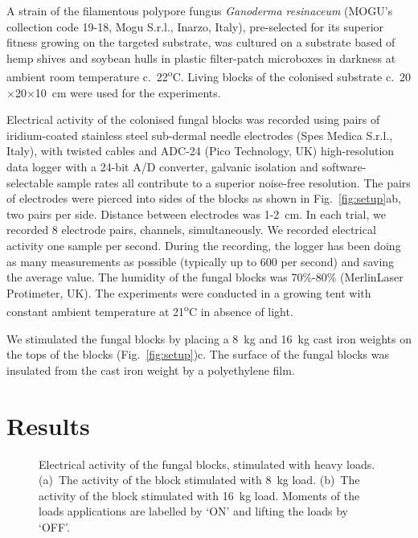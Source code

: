 \documentclass[]{elsarticle}
\begin{document}
A strain of the filamentous polypore fungus \emph{Ganoderma resinaceum} (MOGU's collection code 19-18, Mogu S.r.l., Inarzo, Italy), pre-selected for its superior fitness growing on the targeted substrate, was cultured on a substrate based of hemp shives and soybean hulls in plastic filter-patch microboxes in darkness at ambient room temperature c.~22\textsuperscript{o}C. Living blocks of the colonised substrate c.~20$\times$20$\times$10~cm were used for the experiments.

Electrical activity of the colonised fungal blocks was recorded using pairs of iridium-coated stainless steel sub-dermal needle electrodes (Spes Medica S.r.l., Italy), with twisted cables and  ADC-24 (Pico Technology, UK) high-resolution data logger with a 24-bit A/D converter, galvanic isolation and software-selectable sample rates all contribute to a superior noise-free resolution.  The pairs of electrodes were pierced into sides of the blocks as shown in Fig.~\ref{fig:setup}ab, two pairs per side. Distance between electrodes was 1-2~cm. In each trial, we recorded 8 electrode pairs, channels, simultaneously. We recorded electrical activity one sample per second. During the recording, the logger has been doing as many measurements as possible (typically up to 600 per second) and saving the average value. The humidity of the fungal blocks was 70\%-80\% (MerlinLaser Protimeter, UK). The experiments were conducted in a growing tent with constant ambient temperature at 21\textsuperscript{o}C in absence of light.  

We stimulated the fungal blocks by placing a 8~kg and 16~kg cast iron weights on the tops of the blocks (Fig.~\ref{fig:setup})c. The surface of the fungal blocks was insulated from the cast iron weight by a polyethylene film.

\section{Results}

\begin{figure}[!tbp]
    \centering
    \caption{Electrical activity of the fungal blocks, stimulated with heavy loads. (a)~The activity of the block stimulated with 8~kg load. (b)~The activity of the block stimulated with 16~kg load.  Moments of the loads applications are labelled by `ON' and lifting the loads by `OFF'.}
    \label{fig:examples}
\end{figure}
\end{document}
